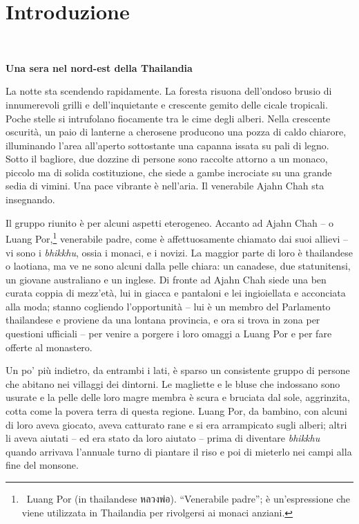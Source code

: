 \chapter{Introduzione}



\textbf{Una sera nel nord-est della Thailandia}

La notte sta scendendo rapidamente. La foresta risuona dell'ondoso
brusio di innumerevoli grilli e dell'inquietante e crescente gemito
delle cicale tropicali. Poche stelle si intrufolano fiocamente tra le
cime degli alberi. Nella crescente oscurità, un paio di lanterne a
cherosene producono una pozza di caldo chiarore, illuminando l'area
all'aperto sottostante una capanna issata su pali di legno. Sotto il
bagliore, due dozzine di persone sono raccolte attorno a un monaco,
piccolo ma di solida costituzione, che siede a gambe incrociate su una
grande sedia di vimini. Una pace vibrante è nell'aria. Il venerabile
Ajahn Chah sta insegnando.

Il gruppo riunito è per alcuni aspetti eterogeneo. Accanto ad Ajahn Chah
-- o Luang Por,\footnote{~Luang Por (in thailandese หลวงพ่อ).
  ``Venerabile padre''; è un'espressione che viene utilizzata in
  Thailandia per rivolgersi ai monaci anziani.} venerabile padre, come è
affettuosamente chiamato dai suoi allievi -- vi sono i \emph{bhikkhu},
ossia i monaci, e i novizi. La maggior parte di loro è thailandese o
laotiana, ma ve ne sono alcuni dalla pelle chiara: un canadese, due
statunitensi, un giovane australiano e un inglese. Di fronte ad Ajahn
Chah siede una ben curata coppia di mezz'età, lui in giacca e pantaloni
e lei ingioiellata e acconciata alla moda; stanno cogliendo
l'opportunità -- lui è un membro del Parlamento thailandese e proviene
da una lontana provincia, e ora si trova in zona per questioni ufficiali
-- per venire a porgere i loro omaggi a Luang Por e per fare offerte al
monastero.

Un po' più indietro, da entrambi i lati, è sparso un consistente gruppo
di persone che abitano nei villaggi dei dintorni. Le magliette e le
bluse che indossano sono usurate e la pelle delle loro magre membra è
scura e bruciata dal sole, aggrinzita, cotta come la povera terra di
questa regione. Luang Por, da bambino, con alcuni di loro aveva giocato,
aveva catturato rane e si era arrampicato sugli alberi; altri li aveva
aiutati -- ed era stato da loro aiutato -- prima di diventare
\emph{bhikkhu} quando arrivava l'annuale turno di piantare il riso e poi
di mieterlo nei campi alla fine del monsone.

